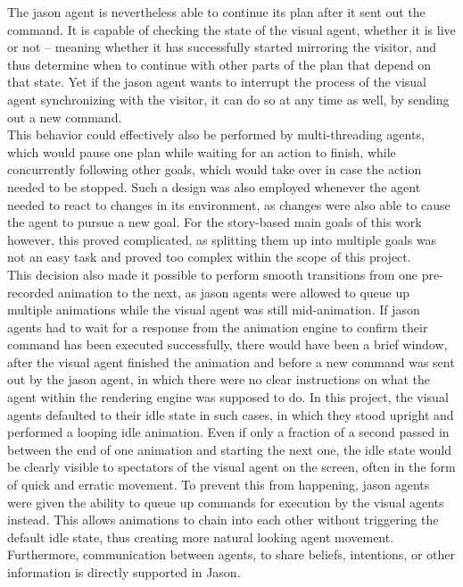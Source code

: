 \documentclass[draft,final]{vutinfth} %
\begin{document}
The \gls{jason agent} is nevertheless able to continue its plan after it sent out the command. 
It is capable of checking the state of the visual agent, whether it is \gls{live} or not – meaning whether it has successfully started mirroring the \gls{visitor}, and thus determine when to continue with other parts of the plan that depend on that state. 
Yet if the \gls{jason agent} wants to interrupt the process of the visual agent synchronizing with the \gls{visitor}, it can do so at any time as well, by sending out a new command. \\
This behavior could effectively also be performed by multi-threading agents, which would pause one plan while waiting for an action to finish, while concurrently following other goals, which would take over in case the action needed to be stopped. 
Such a design was also employed whenever the agent needed to react to changes in its environment, as changes were also able to cause the agent to pursue a new goal. 
For the story-based main goals of this work however, this proved complicated, as splitting them up into multiple goals was not an easy task and proved too complex within the scope of this project.\\
This decision also made it possible to perform smooth transitions from one pre-recorded animation to the next, as \glspl{jason agent} were allowed to queue up multiple animations while the visual agent was still mid-animation.
If \glspl{jason agent} had to wait for a response from the animation engine to confirm their command has been executed successfully, there would have been a brief window, after the visual agent finished the animation and before a new command was sent out by the \gls{jason agent}, in which there were no clear instructions on what the agent within the rendering engine was supposed to do. 
In this project, the visual agents defaulted to their idle state in such cases, in which they stood upright and performed a looping idle animation. 
Even if only a fraction of a second passed in between the end of one animation and starting the next one, the idle state would be clearly visible to spectators of the visual agent on the screen, often in the form of quick and erratic movement. 
To prevent this from happening, \glspl{jason agent} were given the ability to queue up commands for execution by the visual agents instead. 
This allows animations to chain into each other without triggering the default idle state, thus creating more natural looking agent movement. \\
Furthermore, communication between agents, to share beliefs, intentions, or other information is directly supported in Jason. 
\end{document}
